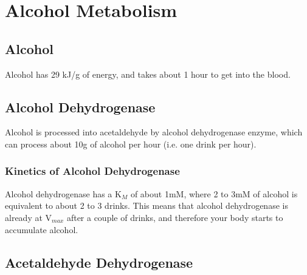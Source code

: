 \section{Alcohol Metabolism}

\subsection{Alcohol}

\begin{center}
\setatomsep{2em}
\end{center}

Alcohol has 29 kJ/g of energy, and takes about 1 hour to get into the blood.

\subsection{Alcohol Dehydrogenase}

Alcohol is processed into acetaldehyde by alcohol dehydrogenase enzyme, which can process about 10g of alcohol per hour (i.e. one drink per hour).

\begin{center}
\setatomsep{2em}
 
 
\end{center}

\subsubsection{Kinetics of Alcohol Dehydrogenase}

Alcohol dehydrogenase has a K$_M$ of about 1mM, where 2 to 3mM of alcohol is equivalent to about 2 to 3 drinks.
This means that alcohol dehydrogenase is already at V$_{max}$ after a couple of drinks, and therefore your body starts to accumulate alcohol.

\subsection{Acetaldehyde Dehydrogenase}

\begin{center}
\setatomsep{2em}
 
 
\end{center}

